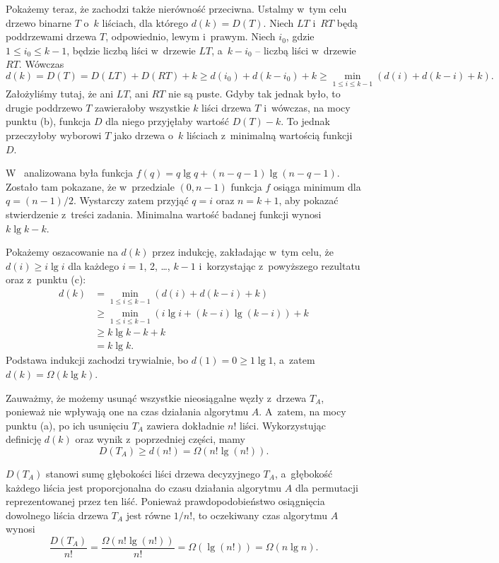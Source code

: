 Pokażemy teraz, że zachodzi także nierówność przeciwna.
Ustalmy w~tym celu drzewo binarne $T$ o~$k$ liściach, dla którego $d(k)=D(T)$.
Niech $LT$ i~$RT$ będą poddrzewami drzewa $T$, odpowiednio, lewym i~prawym.
Niech $i_0$, gdzie $1\le i_0\le k-1$, będzie liczbą liści w~drzewie $LT$, a~$k-i_0$ -- liczbą liści w~drzewie $RT$.
Wówczas
\[
    d(k) = D(T) = D(LT)+D(RT)+k \ge d(i_0)+d(k-i_0)+k \ge \min_{1\le i\le k-1}(d(i)+d(k-i)+k).
\]
Założyliśmy tutaj, że ani $LT$, ani $RT$ nie są puste.
Gdyby tak jednak było, to drugie poddrzewo $T$ zawierałoby wszystkie $k$ liści drzewa $T$ i~wówczas, na mocy punktu (b), funkcja $D$ dla niego przyjęłaby wartość $D(T)-k$.
To jednak przeczyłoby wyborowi $T$ jako drzewa o~$k$ liściach z~minimalną wartością funkcji $D$.

\subproblem %
W~ analizowana była funkcja $f(q)=q\lg q+(n-q-1)\lg(n-q-1)$.
Zostało tam pokazane, że w~przedziale $(0,n-1)$ funkcja $f$ osiąga minimum dla $q=(n-1)/2$.
Wystarczy zatem przyjąć $q=i$ oraz $n=k+1$, aby pokazać stwierdzenie z~treści zadania.
Minimalna wartość badanej funkcji wynosi $k\lg k-k$.

Pokażemy oszacowanie na $d(k)$ przez indukcję, zakładając w~tym celu, że $d(i)\ge i\lg i$ dla każdego $i=1$, 2, \dots, $k-1$ i~korzystając z~powyższego rezultatu oraz z~punktu (c):
\begin{align*}
	d(k) &= \min_{1\le i\le k-1}(d(i)+d(k-i)+k) \\
	&\ge \min_{1\le i\le k-1}(i\lg i+(k-i)\lg(k-i))+k \\
	&\ge k\lg k-k+k \\
	&= k\lg k.
\end{align*}
Podstawa indukcji zachodzi trywialnie, bo $d(1)=0\ge 1\lg1$, a~zatem $d(k)=\Omega(k\lg k)$.

\subproblem %
Zauważmy, że możemy usunąć wszystkie nieosiągalne węzły z~drzewa $T_A$, ponieważ nie wpływają one na czas działania algorytmu $A$.
A~zatem, na mocy punktu (a), po ich usunięciu $T_A$ zawiera dokładnie $n!$ liści.
Wykorzystując definicję $d(k)$ oraz wynik z~poprzedniej części, mamy
\[
	D(T_A) \ge d(n!) = \Omega(n!\lg(n!)).
\]

$D(T_A)$ stanowi sumę głębokości liści drzewa decyzyjnego $T_A$, a~głębokość każdego liścia jest proporcjonalna do czasu działania algorytmu $A$ dla permutacji reprezentowanej przez ten liść.
Ponieważ prawdopodobieństwo osiągnięcia dowolnego liścia drzewa $T_A$ jest równe $1/n!$, to oczekiwany czas algorytmu $A$ wynosi
\[
	\frac{D(T_A)}{n!} = \frac{\Omega(n!\lg(n!))}{n!} = \Omega(\lg(n!)) = \Omega(n\lg n).
\]

